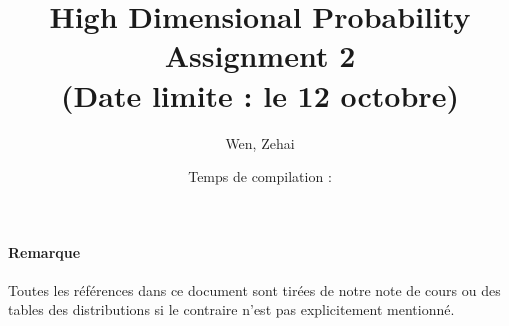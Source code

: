 \documentclass[../main.tex]{subfiles}
\title{High Dimensional Probability Assignment 2 \\ (Date limite : le 12 octobre)}
\author{Wen, Zehai }
\date{Temps de compilation : \DTMnow}
\begin{document}
\maketitle

\paragraph{Remarque}
Toutes les références dans ce document sont tirées de notre note de cours ou 
des tables des distributions si le contraire n'est pas explicitement mentionné.



\end{document}
